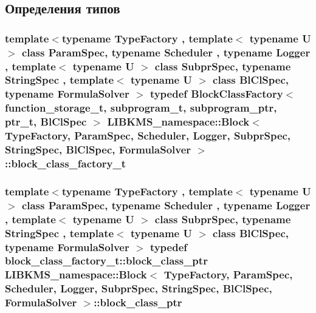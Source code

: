 \subsection{Определения типов}
\hypertarget{classLIBKMS__namespace_1_1Block_abbc80ab417de8b644b70879fe6e330f5}{
\subsubsection[{block\-\_\-class\-\_\-factory\-\_\-t}]{\setlength{\rightskip}{0pt plus 5cm}template$<$typename Type\-Factory , template$<$ typename U $>$ class Param\-Spec, typename Scheduler , typename Logger , template$<$ typename U $>$ class Subpr\-Spec, typename String\-Spec , template$<$ typename U $>$ class Bl\-Cl\-Spec, typename Formula\-Solver $>$ typedef {\bf Block\-Class\-Factory}$<$ {\bf function\-\_\-storage\-\_\-t}, {\bf subprogram\-\_\-t}, {\bf subprogram\-\_\-ptr}, {\bf ptr\-\_\-t}, Bl\-Cl\-Spec $>$ {\bf L\-I\-B\-K\-M\-S\-\_\-namespace\-::\-Block}$<$ {\bf Type\-Factory}, Param\-Spec, Scheduler, Logger, Subpr\-Spec, String\-Spec, Bl\-Cl\-Spec, Formula\-Solver $>$\-::{\bf block\-\_\-class\-\_\-factory\-\_\-t}}}\label{classLIBKMS__namespace_1_1Block_abbc80ab417de8b644b70879fe6e330f5}
\hypertarget{classLIBKMS__namespace_1_1Block_ae813a32e603fb01d7e86ef4afcdc91ae}{
\subsubsection[{block\-\_\-class\-\_\-ptr}]{\setlength{\rightskip}{0pt plus 5cm}template$<$typename Type\-Factory , template$<$ typename U $>$ class Param\-Spec, typename Scheduler , typename Logger , template$<$ typename U $>$ class Subpr\-Spec, typename String\-Spec , template$<$ typename U $>$ class Bl\-Cl\-Spec, typename Formula\-Solver $>$ typedef {\bf block\-\_\-class\-\_\-factory\-\_\-t\-::block\-\_\-class\-\_\-ptr} {\bf L\-I\-B\-K\-M\-S\-\_\-namespace\-::\-Block}$<$ {\bf Type\-Factory}, Param\-Spec, Scheduler, Logger, Subpr\-Spec, String\-Spec, Bl\-Cl\-Spec, Formula\-Solver $>$\-::{\bf block\-\_\-class\-\_\-ptr}}}\label{classLIBKMS__namespace_1_1Block_ae813a32e603fb01d7e86ef4afcdc91ae}
